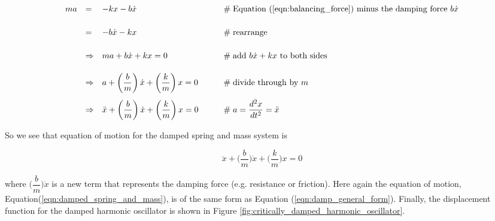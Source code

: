\documentclass{article}
\theoremstyle{definition}
\begin{document}
\medskip
\begin{equation*}
\begin{array}{llll}
ma 
&=& - kx -b \dot{x} 
		&\hspace{2em}\mathrel{\#} \text{Equation (\ref{eqn:balancing_force}) 
		                                  minus the damping force $b \dot{x}$} \\
[16pt]	
&=& -b \dot{x} - kx 
		&\hspace{2em} \mathrel{\#} \text{rearrange}	\\
[16pt]	
&\Rightarrow& ma + b \dot{x} + kx = 0
		&\hspace{2em} \mathrel{\#} \text{add $b \dot{x} + kx$ to both sides} \\
[14pt]
&\Rightarrow& a + \left (\dfrac{b}{m} \right )\dot{x} + \left (\dfrac{k}{m} \right)  x = 0
		&\hspace{2em} \mathrel{\#} \text{divide through by $m$} \\
[14pt]
&\Rightarrow& \ddot{x} + \left ( \dfrac{b}{m}\right ) \dot{x} + \left (\dfrac{k}{m} \right ) x = 0
		&\hspace{2em} \mathrel{\#} a = \dfrac{d^2x}{dt^2} = \ddot{x} \\

\end{array}
\end{equation*}

\bigskip
\noindent
So we see that equation of motion for the damped 
spring and mass system is

\medskip
\begin{equation}
\ddot{x} + \bigg (\dfrac{b}{m} \bigg ) \dot{x} + \bigg ( \dfrac{k}{m} \bigg ) x = 0
\label{eqn:damped_spring_and_mass}
\end{equation}

\smallskip
{
\noindent
where $\bigg (\dfrac{b}{m} \bigg ) \dot{x}$ is a new term that
represents the damping force (e.g. resistance or friction).  Here
again the equation of motion, Equation(\ref{eqn:damped_spring_and_mass}), 
is of the same form as Equation (\ref{eqn:damp_general_form}).  
Finally, the displacement function for the damped harmonic oscillator is shown
in Figure \ref{fig:critically_damped_harmonic_oscillator}.  \par
}
\end{document}
